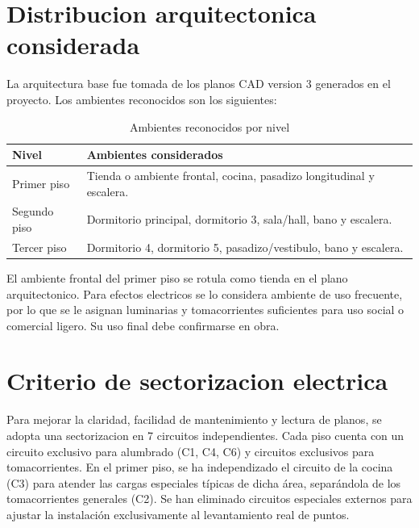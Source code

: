 \section{Distribucion arquitectonica considerada}

La arquitectura base fue tomada de los planos CAD version 3 generados en el proyecto. Los ambientes reconocidos son los siguientes:

\begin{table}[H]
\centering
\small
\caption{Ambientes reconocidos por nivel}
\label{tab:ambientes-reconocidos}
\begin{tabularx}{\textwidth}{L{2.4cm}Y}
\toprule
\textbf{Nivel} & \textbf{Ambientes considerados} \\
\midrule
Primer piso & Tienda o ambiente frontal, cocina, pasadizo longitudinal y escalera. \\
Segundo piso & Dormitorio principal, dormitorio 3, sala/hall, bano y escalera. \\
Tercer piso & Dormitorio 4, dormitorio 5, pasadizo/vestibulo, bano y escalera. \\
\bottomrule
\end{tabularx}
\end{table}

El ambiente frontal del primer piso se rotula como tienda en el plano arquitectonico. Para efectos electricos se lo considera ambiente de uso frecuente, por lo que se le asignan luminarias y tomacorrientes suficientes para uso social o comercial ligero. Su uso final debe confirmarse en obra.

\section{Criterio de sectorizacion electrica}

Para mejorar la claridad, facilidad de mantenimiento y lectura de planos, se adopta una sectorizacion en 7 circuitos independientes. Cada piso cuenta con un circuito exclusivo para alumbrado (C1, C4, C6) y circuitos exclusivos para tomacorrientes. En el primer piso, se ha independizado el circuito de la cocina (C3) para atender las cargas especiales típicas de dicha área, separándola de los tomacorrientes generales (C2). Se han eliminado circuitos especiales externos para ajustar la instalación exclusivamente al levantamiento real de puntos.


